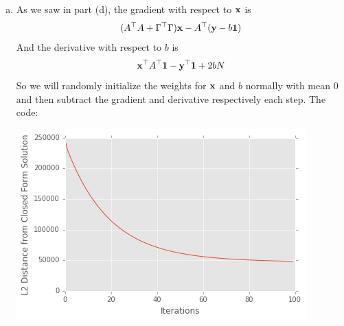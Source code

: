 \documentclass[12pt,letterpaper,fleqn]{hmcpset}
\begin{document}
\begin{enumerate}[(a)]
    \item
        As we saw in part (d), the gradient with respect to ${\bf x}$ is
            $$ (A^\top A + \Gamma^\top \Gamma){\bf x} - A^\top ({\bf y}  - b{\bf 1})$$
        And the derivative with respect to $b$ is 
            $${\bf x}^\top A^\top{\bf 1} -{\bf y}^\top{\bf 1} +2 b N$$
        So we will randomly initialize the weights for ${\bf x}$ and $b$ normally with mean $0$ and then subtract the gradient and derivative respectively each step. The code:
        
        \includegraphics[scale = .8]{graddescent.png}


\end{enumerate}


\newpage
\end{document}
